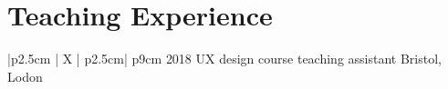 \section{Teaching Experience}
\begin{mySectionContents}

\iftrue %
\begin{myTableEnv}{|p{2.5cm} | X | p{2.5cm}| p{9cm}}
    \myRow
        {\myPeriod}{2018}
        {\myPosition}{UX design course teaching assistant}
    \myRow
        {\myLocation}{Bristol, Lodon}
        {}{}
    \end{myTableEnv}

\myTablesSeparator
\fi
\end{mySectionContents}

